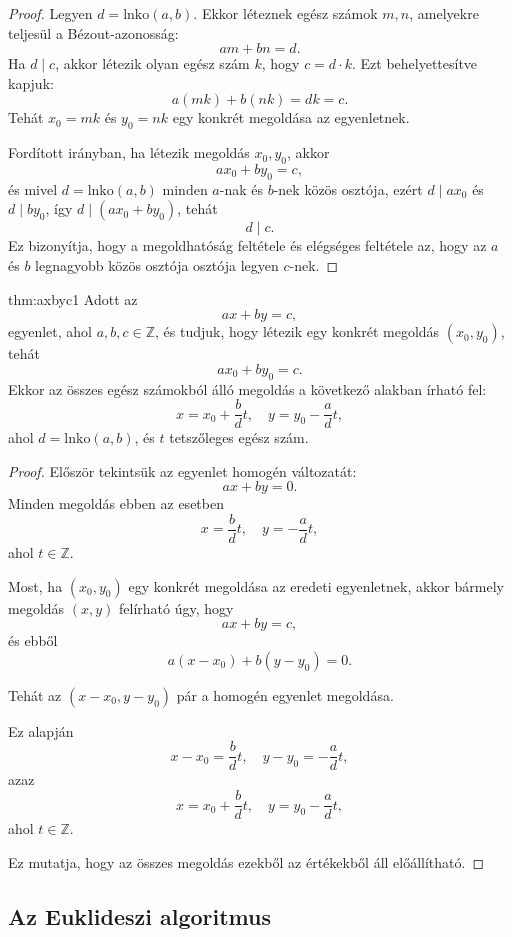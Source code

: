\begin{proof}
Legyen $d=\mathrm{lnko}(a,b)$. Ekkor léteznek egész számok $m,n$,
amelyekre teljesül a Bézout-azonosság:
\[
am+bn=d.
\]
Ha $d\mid c$, akkor létezik olyan egész szám $k$, hogy $c=d\cdot k$.
Ezt behelyettesítve kapjuk:
\[
a(mk)+b(nk)=dk=c.
\]
Tehát $x_{0}=mk$ és $y_{0}=nk$ egy konkrét megoldása az egyenletnek.

Fordított irányban, ha létezik megoldás $x_{0},y_{0}$, akkor
\[
ax_{0}+by_{0}=c,
\]
és mivel $d=\mathrm{lnko}(a,b)$ minden $a$-nak és $b$-nek közös
osztója, ezért $d\mid ax_{0}$ és $d\mid by_{0}$, így $d\mid(ax_{0}+by_{0})$,
tehát
\[
d\mid c.
\]
Ez bizonyítja, hogy a megoldhatóság feltétele és elégséges feltétele
az, hogy az $a$ és $b$ legnagyobb közös osztója osztója legyen $c$-nek. 
\end{proof}
\begin{theorem}{thm:axbyc1}
Adott az
\[
ax+by=c,
\]
egyenlet, ahol $a,b,c\in\mathbb{Z}$, és tudjuk, hogy létezik egy
konkrét megoldás $(x_{0},y_{0})$, tehát
\[
ax_{0}+by_{0}=c.
\]
Ekkor az összes egész számokból álló megoldás a következő alakban
írható fel:
\[
x=x_{0}+\frac{b}{d}t,\quad y=y_{0}-\frac{a}{d}t,
\]
ahol $d=\mathrm{lnko}(a,b)$, és $t$ tetszőleges egész szám.
\end{theorem}

\begin{proof}
Először tekintsük az egyenlet homogén változatát:
\[
ax+by=0.
\]
Minden megoldás ebben az esetben
\[
x=\frac{b}{d}t,\quad y=-\frac{a}{d}t,
\]
ahol $t\in\mathbb{Z}$.

Most, ha $(x_{0},y_{0})$ egy konkrét megoldása az eredeti egyenletnek,
akkor bármely megoldás $(x,y)$ felírható úgy, hogy
\[
ax+by=c,
\]
és ebből
\[
a(x-x_{0})+b(y-y_{0})=0.
\]

Tehát az $(x-x_{0},y-y_{0})$ pár a homogén egyenlet megoldása.

Ez alapján
\[
x-x_{0}=\frac{b}{d}t,\quad y-y_{0}=-\frac{a}{d}t,
\]
azaz
\[
x=x_{0}+\frac{b}{d}t,\quad y=y_{0}-\frac{a}{d}t,
\]
ahol $t\in\mathbb{Z}$.

Ez mutatja, hogy az összes megoldás ezekből az értékekből áll előállítható. 
\end{proof}

\subsection*{Az Euklideszi algoritmus}

